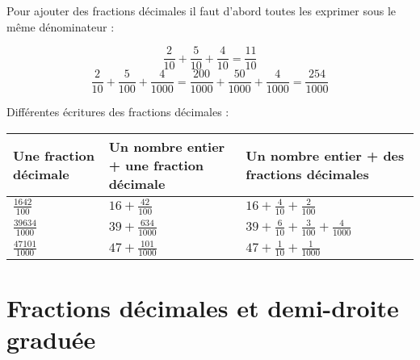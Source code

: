 \begin{pageCours}
\begin{Mt}
Pour ajouter des fractions décimales il faut d'abord toutes les exprimer sous le même dénominateur :
\begin{Ex}
\[\frac{2}{10}+\frac{5}{10}+\frac{4}{10}=\frac{11}{10}\]
\[\frac{2}{10}+\frac{5}{100}+\frac{4}{1000}=\frac{200}{1000}+\frac{50}{1000}+\frac{4}{1000}=\frac{254}{1000}\]
\end{Ex}
\end{Mt}

\begin{Mt}
Différentes écritures des fractions décimales :
\begin{center}
\begin{tabular}{M{5cm}|M{5cm}|M{5cm}}
Une fraction décimale & Un nombre entier + une fraction décimale & Un nombre entier + des fractions décimales \\\hline\hline
$\frac{1642}{100}$ & $16+\frac{42}{100}$ & $16+\frac{4}{10}+\frac{2}{100}$ \\\hline
$\frac{39634}{1000}$ & $39+\frac{634}{1000}$ & $39+\frac{6}{10}+\frac{3}{100}+\frac{4}{1000}$ \\\hline
$\frac{47101}{1000}$ & $47+\frac{101}{1000}$ & $47+\frac{1}{10}+\frac{1}{1000}$ \\
\end{tabular}
\end{center}
\end{Mt}


\section{Fractions décimales et demi-droite graduée}


\end{pageCours}
